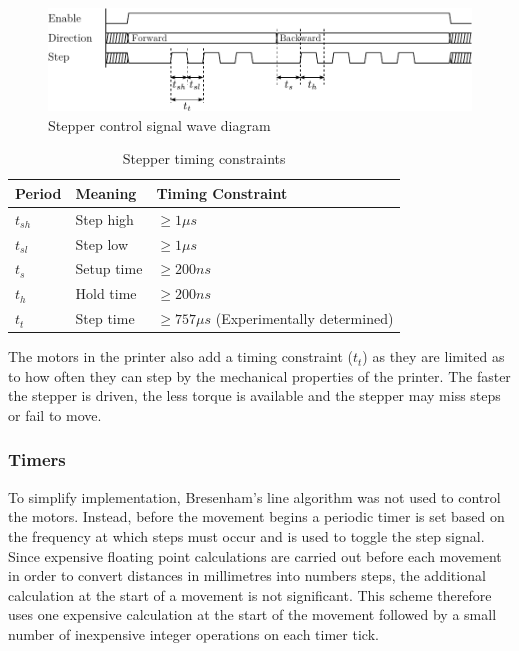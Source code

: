 				\begin{figure}
					\includegraphics[width=1\textwidth]{diagrams/stepperWave.pdf}
					\caption{Stepper control signal wave diagram}
					\label{fig:stepperWave}
				\end{figure}
				
				\begin{table}
					\centering
					\begin{tabular}{l l l}
						\toprule
						Period & Meaning & Timing Constraint\\
						\midrule
						$t_{sh}$ & Step high  & $\ge 1\mu{}s$ \cite{allegro} \\
						$t_{sl}$ & Step low   & $\ge 1\mu{}s$ \cite{allegro} \\
						\addlinespace
						$t_{s}$  & Setup time & $\ge 200ns$   \cite{allegro} \\
						$t_{h}$  & Hold time  & $\ge 200ns$   \cite{allegro} \\
						\addlinespace
						$t_{t}$  & Step time  & $\ge 757\mu{}s$ (Experimentally determined) \\
						\bottomrule
					\end{tabular}
					
					\caption{Stepper timing constraints}
					\label{tab:stepperTiming}
				\end{table}
				
				The motors in the printer also add a timing constraint ($t_t$) as they
				are limited as to how often they can step by the mechanical properties
				of the printer. The faster the stepper is driven, the less torque is
				available and the stepper may miss steps or fail to move.
			
			\subsubsection{Timers}
				
				To simplify implementation, Bresenham's line algorithm \cite{bresenham}
				was not used to control the motors. Instead, before the movement begins
				a periodic timer is set based on the frequency at which steps must occur
				and is used to toggle the step signal. Since expensive floating point
				calculations are carried out before each movement in order to convert
				distances in millimetres into numbers steps, the additional calculation
				at the start of a movement is not significant. This scheme therefore
				uses one expensive calculation at the start of the movement followed by
				a small number of inexpensive integer operations on each timer tick.
				
